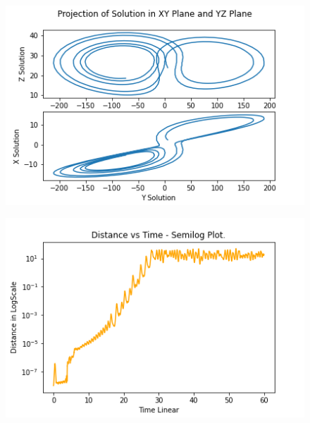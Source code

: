 \documentclass{article}
\begin{document}
\begin{figure}[!htb]
    \centering
    \includegraphics[scale=0.7]{q2_2.png}
    \label{fig:q2_2.png}
\end{figure}
\begin{figure}[!htb]
    \centering
    \includegraphics[scale=0.7]{q2_3.png}
    \label{fig:q2_3.png}
\end{figure}
\end{document}
